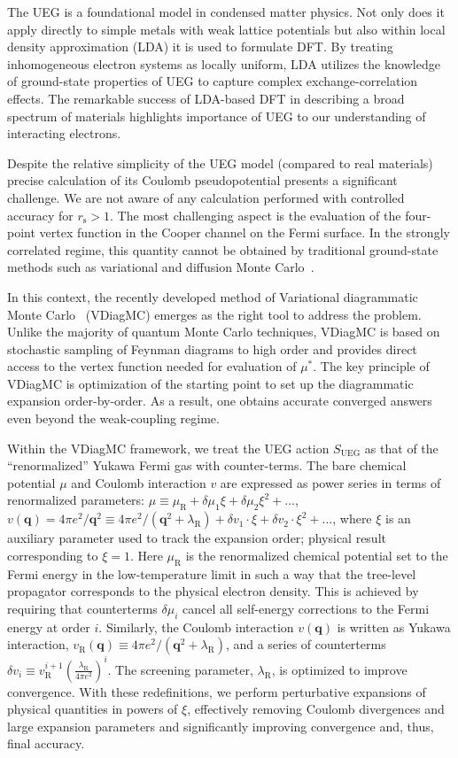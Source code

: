 \documentclass[%
 reprint,
superscriptaddress,
 amsmath,amssymb,
 aps,
prx,
]{revtex4-2}
\newcommand{\bq}{\mathbf{q}}
\newcommand{\txs}{\text{s}}
\newcommand{\txR}{\text{R}}
\newcommand{\txUEG}{\text{UEG}}
\begin{document}
The UEG is a foundational model in condensed matter physics. 
Not only does it apply directly to simple metals with weak lattice potentials but also within local density approximation (LDA) it is used to formulate DFT. By treating inhomogeneous electron systems as locally uniform, LDA utilizes the knowledge of ground-state properties of UEG to capture complex exchange-correlation effects. The remarkable success of LDA-based DFT in describing a broad spectrum of materials highlights importance of UEG to our understanding of interacting electrons.

Despite the relative simplicity of the UEG model (compared to real materials) precise calculation of its Coulomb pseudopotential
presents a significant challenge. We are not aware of any calculation performed with controlled accuracy for $r_\txs>1$.   
The most challenging aspect is the evaluation of the four-point vertex function in the Cooper channel on the Fermi surface. In the strongly correlated regime, this quantity cannot be obtained by traditional ground-state methods such as variational and diffusion Monte Carlo~\cite{vmc1,vmc2,dmc1}. 

In this context, the recently developed method of Variational diagrammatic Monte Carlo~\cite{diagmc1,diagmc2,diagmc2010,detdiagmc,diagmclatest,diagmckozik,vdiagmc1,vdiagmc2} (VDiagMC) emerges as the right tool
to address the problem. Unlike the majority of quantum Monte Carlo techniques, VDiagMC is based on stochastic sampling of Feynman diagrams to high order
and provides direct access to the vertex function needed for evaluation
of $\mu^*$. The key principle of VDiagMC is optimization of the starting point to set up the diagrammatic expansion order-by-order.
As a result, one obtains accurate converged answers even beyond the 
weak-coupling regime. 

Within the VDiagMC framework, we treat the UEG action $S_{\txUEG}$ as that of the ``renormalized'' Yukawa Fermi gas with counter-terms. 
The bare chemical potential $\mu$ and Coulomb interaction $v$ are expressed as power series in terms of renormalized parameters: 
$\mu \equiv \mu_\txR + \delta \mu_1 \xi + \delta \mu_2 \xi^2 + ...$, 
$v(\bq) = 4\pi e^2/\bq^2 \equiv 4\pi e^2/(\bq^2+\lambda_\txR)
+ \delta v_1 \cdot \xi + \delta v_2 \cdot \xi^2+\dots $,
where $\xi$ is an auxiliary parameter used to track the
expansion order; physical result corresponding to $\xi=1$. Here $\mu_\txR$ is the renormalized 
chemical potential set to the Fermi energy in the low-temperature limit
in such a way that the tree-level propagator corresponds to the physical electron density. This is achieved by requiring that counterterms $\delta \mu_i$ cancel all self-energy corrections to the Fermi energy 
at order $i$. Similarly, the Coulomb interaction $v(\bq)$ is written as Yukawa interaction, $v_\txR(\bq) \equiv 4\pi e^2/(\bq^2+\lambda_\txR)$, and a series of counterterms $\delta v_i \equiv v_\txR^{i+1}\left(\frac{\lambda_\txR}{4\pi e^2}\right)^{i}$.
The screening parameter, $\lambda_\txR$, is optimized to improve
convergence. With these redefinitions, we perform perturbative 
expansions of physical quantities in powers of $\xi$, 
effectively removing Coulomb divergences and large expansion parameters
and significantly improving convergence and, thus, final accuracy. 
\end{document}
